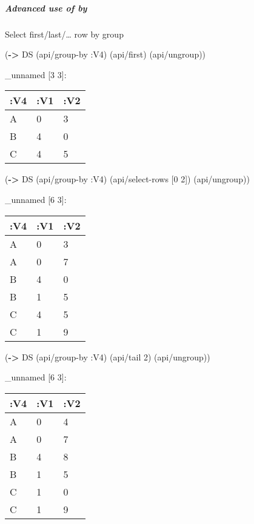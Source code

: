\documentclass[]{article}
\newenvironment{Shaded}{\begin{snugshade}}{\end{snugshade}}
\newcommand{\KeywordTok}[1]{\textcolor[rgb]{0.13,0.29,0.53}{\textbf{#1}}}
\newcommand{\DecValTok}[1]{\textcolor[rgb]{0.00,0.00,0.81}{#1}}
\newcommand{\AttributeTok}[1]{\textcolor[rgb]{0.77,0.63,0.00}{#1}}
\newcommand{\NormalTok}[1]{#1}
\let\oldsubparagraph\subparagraph
\renewcommand{\subparagraph}[1]{\oldsubparagraph{#1}\mbox{}}
\begin{document}
\subparagraph{Advanced use of by}\label{advanced-use-of-by}

Select first/last/\ldots{} row by group

\begin{Shaded}
\begin{Highlighting}[]
\NormalTok{(}\KeywordTok{->}\NormalTok{ DS}
\NormalTok{    (api/group-by }\AttributeTok{:V4}\NormalTok{)}
\NormalTok{    (api/first)}
\NormalTok{    (api/ungroup))}
\end{Highlighting}
\end{Shaded}

\_unnamed {[}3 3{]}:

\begin{longtable}[]{@{}lll@{}}
\toprule
:V4 & :V1 & :V2\tabularnewline
\midrule
\endhead
A & 0 & 3\tabularnewline
B & 4 & 0\tabularnewline
C & 4 & 5\tabularnewline
\bottomrule
\end{longtable}

\begin{Shaded}
\begin{Highlighting}[]
\NormalTok{(}\KeywordTok{->}\NormalTok{ DS}
\NormalTok{    (api/group-by }\AttributeTok{:V4}\NormalTok{)}
\NormalTok{    (api/select-rows [}\DecValTok{0} \DecValTok{2}\NormalTok{])}
\NormalTok{    (api/ungroup))}
\end{Highlighting}
\end{Shaded}

\_unnamed {[}6 3{]}:

\begin{longtable}[]{@{}lll@{}}
\toprule
:V4 & :V1 & :V2\tabularnewline
\midrule
\endhead
A & 0 & 3\tabularnewline
A & 0 & 7\tabularnewline
B & 4 & 0\tabularnewline
B & 1 & 5\tabularnewline
C & 4 & 5\tabularnewline
C & 1 & 9\tabularnewline
\bottomrule
\end{longtable}

\begin{Shaded}
\begin{Highlighting}[]
\NormalTok{(}\KeywordTok{->}\NormalTok{ DS}
\NormalTok{    (api/group-by }\AttributeTok{:V4}\NormalTok{)}
\NormalTok{    (api/tail }\DecValTok{2}\NormalTok{)}
\NormalTok{    (api/ungroup))}
\end{Highlighting}
\end{Shaded}

\_unnamed {[}6 3{]}:

\begin{longtable}[]{@{}lll@{}}
\toprule
:V4 & :V1 & :V2\tabularnewline
\midrule
\endhead
A & 0 & 4\tabularnewline
A & 0 & 7\tabularnewline
B & 4 & 8\tabularnewline
B & 1 & 5\tabularnewline
C & 1 & 0\tabularnewline
C & 1 & 9\tabularnewline
\bottomrule
\end{longtable}
\end{document}
